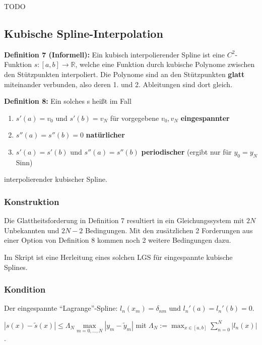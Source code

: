 \documentclass[a4paper]{article}
\begin{document}
TODO

\subsection{Kubische Spline-Interpolation}

\textbf{Definition 7 (Informell):} Ein kubisch interpolierender Spline ist eine
$C^2$-Funktion $s: [a, b] \to \mathbb{R}$, welche eine Funktion durch kubische
Polynome zwischen den Stützpunkten interpoliert. Die Polynome sind an den
Stützpunkten \textbf{glatt} miteinander verbunden, also deren 1. und 2.
Ableitungen sind dort gleich.

\begin{samepage}
\textbf{Definition 8:} Ein solches s heißt im Fall
\begin{enumerate}
    \item $s'(a) = v_0$ und $s'(b) = v_N$ für vorgegebene $v_0, v_N$
    \textbf{eingespannter}
    \item $s''(a) = s''(b) = 0$ \textbf{natürlicher}
    \item $s'(a) = s'(b)$ und $s''(a) = s''(b)$ \textbf{periodischer}
    (ergibt nur für $y_0 = y_N$ Sinn)
\end{enumerate}
interpolierender kubischer Spline.
\end{samepage}

\subsubsection{Konstruktion}

Die Glattheitsforderung in Definition 7 resultiert in ein Gleichungssystem mit
$2N$ Unbekannten und $2N - 2$ Bedingungen. Mit den zusätzlichen 2 Forderungen
aus einer Option von Definition 8 kommen noch 2 weitere Bedingungen dazu.

Im Skript ist eine Herleitung eines solchen LGS für eingespannte kubische
Splines. 

\subsubsection{Kondition}

Der eingespannte \enquote{Lagrange}-Spline: $l_n(x_m) = \delta_{nm}$ und
$l_n'(a) = l_n'(b) = 0$.

\vspace{1em}

$|s(x) - \tilde{s}(x)| \le \Lambda_N \max\limits_{m = 0, \dots, N} |y_m -
\tilde{y}_m|$ mit $\Lambda_N := \max_{x \in [a, b]} \sum_{n = 0}^N |l_n(x)|$.
\end{document}
